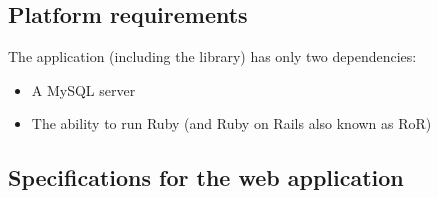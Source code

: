 \subsection{Platform requirements}

The application (including the library) has only two dependencies:
\begin{itemize}
  \item A MySQL server
  \item The ability to run Ruby (and Ruby on Rails also known as RoR)
\end{itemize}

\subsection{Specifications for the web application}

